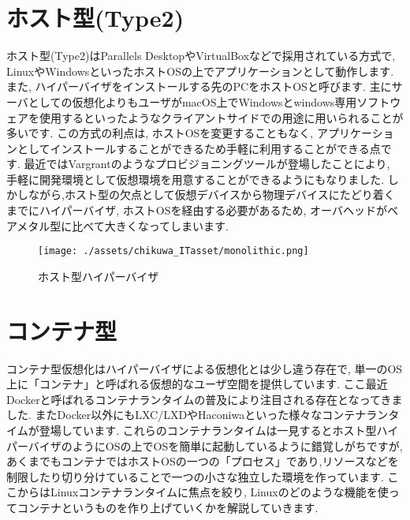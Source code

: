\section{ホスト型(Type2)}
ホスト型(Type2)はParallels DesktopやVirtualBoxなどで採用されている方式で, LinuxやWindowsといったホストOSの上でアプリケーションとして動作します. また, ハイパーバイザをインストールする先のPCをホストOSと呼びます. 主にサーバとしての仮想化よりもユーザがmacOS上でWindowsとwindows専用ソフトウェアを使用するといったようなクライアントサイドでの用途に用いられることが多いです. この方式の利点は, ホストOSを変更することもなく, アプリケーションとしてインストールすることができるため手軽に利用することができる点です. 最近ではVargrantのようなプロビジョニングツールが登場したことにより, 手軽に開発環境として仮想環境を用意することができるようにもなりました. しかしながら,ホスト型の欠点として仮想デバイスから物理デバイスにたどり着くまでにハイパーバイザ, ホストOSを経由する必要があるため, オーバヘッドがベアメタル型に比べて大きくなってしまいます.
\begin{figure}[htbp]
    \centering
    \texttt{[image: ./assets/chikuwa\_ITasset/monolithic.png]}
    \caption{ホスト型ハイパーバイザ}
    \label{fig:hosthypervisor}
\end{figure}
\section{コンテナ型}
コンテナ型仮想化はハイパーバイザによる仮想化とは少し違う存在で, 単一のOS上に「コンテナ」と呼ばれる仮想的なユーザ空間を提供しています. ここ最近Dockerと呼ばれるコンテナランタイムの普及により注目される存在となってきました. またDocker以外にもLXC/LXDやHaconiwaといった様々なコンテナランタイムが登場しています. これらのコンテナランタイムは一見するとホスト型ハイパーバイザのようにOSの上でOSを簡単に起動しているように錯覚しがちですが, あくまでもコンテナではホストOSの一つの「プロセス」であり,リソースなどを制限したり切り分けていることで一つの小さな独立した環境を作っています. ここからはLinuxコンテナランタイムに焦点を絞り, Linuxのどのような機能を使ってコンテナというものを作り上げていくかを解説していきます.

